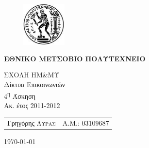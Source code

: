 \begin{titlepage}
\begin{center}
\begin{figure}[h] 
     \includegraphics[width=0.2\textwidth]{title/ntua_logo}
\end{figure}
\vspace{1cm}
\begin{LARGE}\textbf{ΕΘΝΙΚΟ ΜΕΤΣΟΒΙΟ ΠΟΛΥΤΕΧΝΕΙΟ\\[1.5cm]}\end{LARGE}
\begin{Large}
ΣΧΟΛΗ ΗΜ\&ΜΥ\\
Δίκτυα Επικοινωνιών\\[2cm]
4\textsuperscript{η} Άσκηση\\
Ακ. έτος 2011-2012\\
\end{Large}
\vfill
\begin{flushright}
\begin{tabular}{l r}
{Γρηγόρης \textsc{Λύρας}}&
{Α.Μ.: 03109687}\\
\end{tabular}
\end{flushright}

\large\today\\
\end{center}
\end{titlepage}


